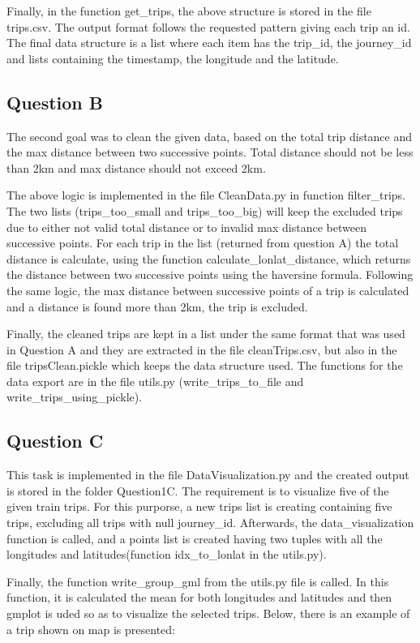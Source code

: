 \documentclass[12pt]{article}
\begin{document}
	Finally, in the function get\_trips, the above structure is stored in the file trips.csv. The output format follows the requested pattern giving each trip an id. The final data structure is a list where each item has the trip\_id, the journey\_id and lists containing the timestamp, the longitude and the latitude.
	
	\subsection{Question B}
	The second goal was to clean the given data, based on the total trip distance and the max distance between two successive points. Total distance should not be less than 2km and max distance should not exceed 2km.
	
	The above logic is implemented in the file CleanData.py in function filter\_trips. The two lists (trips\_too\_small and trips\_too\_big) will keep the excluded trips due to either not valid total distance or to invalid max distance between successive points. For each trip in the list (returned from question A) the total distance is calculate, using the function calculate\_lonlat\_distance, which returns the distance between two successive points using the haversine formula. Following the same logic, the max distance between successive points of a trip is calculated and a distance is found more than 2km, the trip is excluded.
	
	Finally, the cleaned trips are kept in a list under the same format that was used in Question A and they are extracted in the file cleanTrips.csv, but also in the file tripsClean.pickle which keeps the data structure used. The functions for the data export are in the file utils.py (write\_trips\_to\_file and write\_trips\_using\_pickle).
	
	\subsection{Question C}
	This task is implemented in the file DataVisualization.py and the created output is stored in the folder Question1C. The requirement is to visualize five of the given train trips. For this purporse, a new trips list is creating containing five trips, excluding all trips with null journey\_id. Afterwards, the data\_visualization function is called, and a points list is created having two tuples with all the longitudes and latitudes(function idx\_to\_lonlat in the utils.py). 
	
	Finally, the function write\_group\_gml from the utils.py file is called. In this function, it is calculated the mean for both longitudes and latitudes and then gmplot is uded so as to visualize the selected trips. Below, there is an example of a trip shown on map is presented:
	
\end{document}
